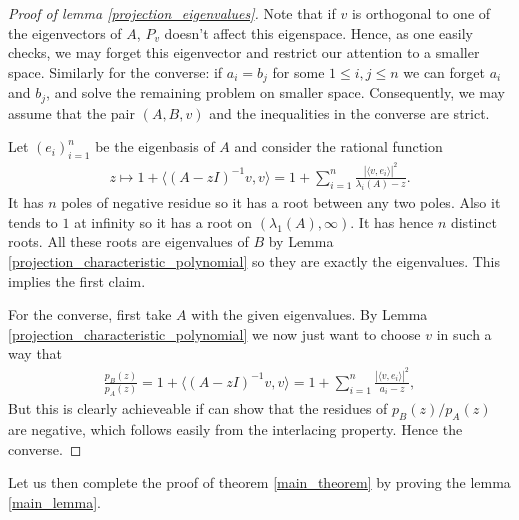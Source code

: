 \begin{proof}[Proof of lemma \ref{projection_eigenvalues}]
	Note that if $v$ is orthogonal to one of the eigenvectors of $A$, $P_{v}$ doesn't affect this eigenspace. Hence, as one easily checks, we may forget this eigenvector and restrict our attention to a smaller space. Similarly for the converse: if $a_{i} = b_{j}$ for some $1 \leq i, j \leq n$ we can forget $a_{i}$ and $b_{j}$, and solve the remaining problem on smaller space. Consequently, we may assume that the pair $(A, B, v)$ and the inequalities in the converse are strict.

	Let $(e_{i})_{i = 1}^{n}$ be the eigenbasis of $A$ and consider the rational function
	\begin{align*}
		z \mapsto 1 + \langle (A - z I)^{-1}v, v\rangle = 1 + \sum_{i = 1}^{n} \frac{|\langle v, e_{i} \rangle|^2}{\lambda_{i}(A) - z}.
	\end{align*}
	It has $n$ poles of negative residue so it has a root between any two poles. Also it tends to $1$ at infinity so it has a root on $(\lambda_{1}(A), \infty)$. It has hence $n$ distinct roots. All these roots are eigenvalues of $B$ by Lemma \ref{projection_characteristic_polynomial} so they are exactly the eigenvalues. This implies the first claim.

	For the converse, first take $A$ with the given eigenvalues. By Lemma \ref{projection_characteristic_polynomial} we now just want to choose $v$ in such a way that
	\begin{align*}
		\frac{p_{B}(z)}{p_{A}(z)} = 1 + \langle (A - z I)^{-1}v, v\rangle= 1 + \sum_{i = 1}^{n} \frac{|\langle v, e_{i} \rangle|^2}{a_{i} - z},
	\end{align*}
	But this is clearly achieveable if can show that the residues of $p_{B}(z)/p_{A}(z)$ are negative, which follows easily from the interlacing property. Hence the converse.
\end{proof}

Let us then complete the proof of theorem \ref{main_theorem} by proving the lemma \ref{main_lemma}.

